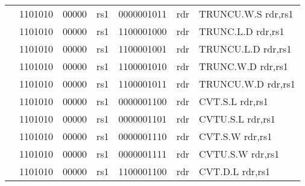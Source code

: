 \begin{table}[p]
\begin{small}
\begin{center}
\begin{tabular}{rcccccccccl}
&
\multicolumn{2}{|c|}{1101010} &
\multicolumn{1}{c|}{00000} &
\multicolumn{1}{c|}{rs1} &
\multicolumn{4}{c|}{0000001011} &
\multicolumn{1}{c|}{rdr} & TRUNCU.W.S rdr,rs1 \\
\cline{2-10}
  

&
\multicolumn{2}{|c|}{1101010} &
\multicolumn{1}{c|}{00000} &
\multicolumn{1}{c|}{rs1} &
\multicolumn{4}{c|}{1100001000} &
\multicolumn{1}{c|}{rdr} & TRUNC.L.D rdr,rs1 \\
\cline{2-10}
  

&
\multicolumn{2}{|c|}{1101010} &
\multicolumn{1}{c|}{00000} &
\multicolumn{1}{c|}{rs1} &
\multicolumn{4}{c|}{1100001001} &
\multicolumn{1}{c|}{rdr} & TRUNCU.L.D rdr,rs1 \\
\cline{2-10}
  

&
\multicolumn{2}{|c|}{1101010} &
\multicolumn{1}{c|}{00000} &
\multicolumn{1}{c|}{rs1} &
\multicolumn{4}{c|}{1100001010} &
\multicolumn{1}{c|}{rdr} & TRUNC.W.D rdr,rs1 \\
\cline{2-10}
  

&
\multicolumn{2}{|c|}{1101010} &
\multicolumn{1}{c|}{00000} &
\multicolumn{1}{c|}{rs1} &
\multicolumn{4}{c|}{1100001011} &
\multicolumn{1}{c|}{rdr} & TRUNCU.W.D rdr,rs1 \\
\cline{2-10}
  

&
\multicolumn{2}{|c|}{1101010} &
\multicolumn{1}{c|}{00000} &
\multicolumn{1}{c|}{rs1} &
\multicolumn{4}{c|}{0000001100} &
\multicolumn{1}{c|}{rdr} & CVT.S.L rdr,rs1 \\
\cline{2-10}
  

&
\multicolumn{2}{|c|}{1101010} &
\multicolumn{1}{c|}{00000} &
\multicolumn{1}{c|}{rs1} &
\multicolumn{4}{c|}{0000001101} &
\multicolumn{1}{c|}{rdr} & CVTU.S.L rdr,rs1 \\
\cline{2-10}
  

&
\multicolumn{2}{|c|}{1101010} &
\multicolumn{1}{c|}{00000} &
\multicolumn{1}{c|}{rs1} &
\multicolumn{4}{c|}{0000001110} &
\multicolumn{1}{c|}{rdr} & CVT.S.W rdr,rs1 \\
\cline{2-10}
  

&
\multicolumn{2}{|c|}{1101010} &
\multicolumn{1}{c|}{00000} &
\multicolumn{1}{c|}{rs1} &
\multicolumn{4}{c|}{0000001111} &
\multicolumn{1}{c|}{rdr} & CVTU.S.W rdr,rs1 \\
\cline{2-10}
  

&
\multicolumn{2}{|c|}{1101010} &
\multicolumn{1}{c|}{00000} &
\multicolumn{1}{c|}{rs1} &
\multicolumn{4}{c|}{1100001100} &
\multicolumn{1}{c|}{rdr} & CVT.D.L rdr,rs1 \\
\cline{2-10}
  


\end{tabular}
\end{center}
\end{small}
\end{table}
